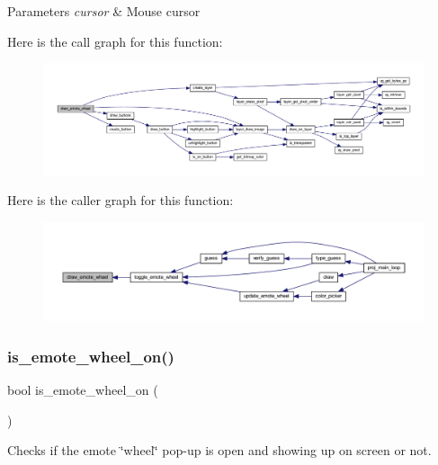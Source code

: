 \begin{DoxyParams}{Parameters}
{\em cursor} & Mouse cursor \\
\hline
\end{DoxyParams}
Here is the call graph for this function\+:\nopagebreak
\begin{figure}[H]
\begin{center}
\leavevmode
\includegraphics[width=350pt]{group__emote_gac2165e24eab22afc199808350c2ef84a_cgraph}
\end{center}
\end{figure}
Here is the caller graph for this function\+:\nopagebreak
\begin{figure}[H]
\begin{center}
\leavevmode
\includegraphics[width=350pt]{group__emote_gac2165e24eab22afc199808350c2ef84a_icgraph}
\end{center}
\end{figure}
\mbox{\label{group__emote_gac9359f9dfee500c297df48a9cdb2fb11}} 
\subsubsection{\texorpdfstring{is\+\_\+emote\+\_\+wheel\+\_\+on()}{is\_emote\_wheel\_on()}}
{\footnotesize\ttfamily bool is\+\_\+emote\+\_\+wheel\+\_\+on (\begin{DoxyParamCaption}{ }\end{DoxyParamCaption})}



Checks if the emote \char`\"{}wheel\char`\"{} pop-\/up is open and showing up on screen or not. 

